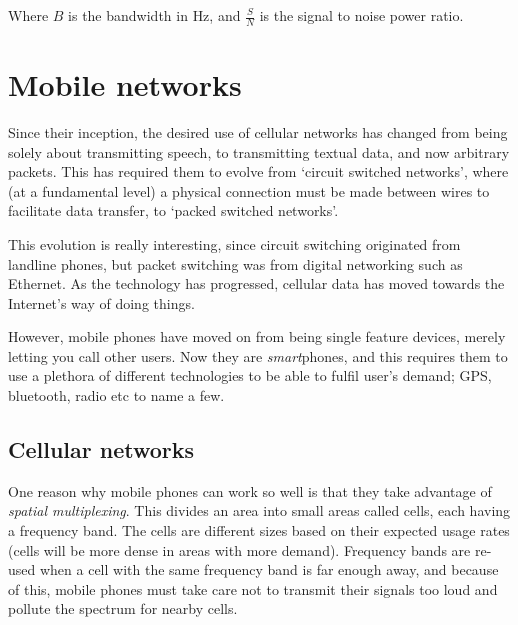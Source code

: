 Where $B$ is the bandwidth in $\si{\hertz}$, and $\frac{S}{N}$ is the signal to
noise power ratio.


\section{Mobile networks}

Since their inception, the desired use of cellular networks has changed from
being solely about transmitting speech, to transmitting textual data, and now
arbitrary packets. This has required them to evolve from `circuit switched
networks', where (at a fundamental level) a physical connection must be made
between wires to facilitate data transfer, to `packed switched networks'.

This evolution is really interesting, since circuit switching originated from
landline phones, but packet switching was from digital networking such as
Ethernet. As the technology has progressed, cellular data has moved towards the
Internet's way of doing things.

However, mobile phones have moved on from being single feature devices, merely
letting you call other users. Now they are \textit{smart}phones, and this
requires them to use a plethora of different technologies to be able to fulfil
user's demand; GPS, bluetooth, radio etc to name a few.

\subsection{Cellular networks}

One reason why mobile phones can work so well is that they take advantage of
\textit{spatial multiplexing}. This divides an area into small areas called
cells, each having a frequency band. The cells are different sizes based on
their expected usage rates (cells will be more dense in areas with more
demand). Frequency bands are re-used when a cell with the same frequency band is
far enough away, and because of this, mobile phones must take care not to
transmit their signals too loud and pollute the spectrum for nearby cells.


